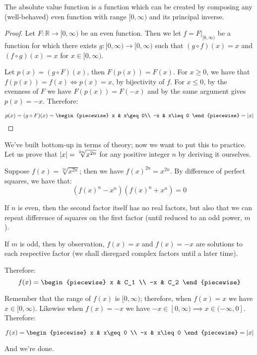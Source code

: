 \begin{theorem}
    The absolute value function is a function which can be created by composing any (well-behaved) even function with range $[0,\infty)$ and its principal inverse.

    \begin{proof}
        Let $F:\mathbb{R}\to[0,\infty)$ be an even function. Then we let $f=F\bigr\rvert_{[0,\infty)}$ be a function for which there exists $g:[0,\infty)\to[0,\infty)$ such that $(g\circ f)(x)=x$ and $(f\circ g)(x)=x$ for $x\in[0,\infty)$.

        Let $p(x)=(g\circ F)(x)$, then $F(p(x))=F(x)$. For $x\geq 0$, we have that $f(p(x))=f(x)\iff p(x)=x$, by bijectivity of $f$. For $x\leq 0$, by the evenness of $F$ we have $F(p(x))=F(-x)$ and by the same argument gives $p(x)=-x$. Therefore:

        $$
            p(x)=(g\circ F)(x)=\begin{piecewise}
                x & x\geq 0\\
                -x & x\leq 0
            \end{piecewise}=\abs{x}
        $$
    \end{proof}
\end{theorem}

\begin{example}
    We've built bottom-up in terms of theory; now we want to put this to practice. Let us prove that $\abs{x}=\sqrt[2n]{x^{2n}}$ for any positive integer $n$ by deriving it ourselves.

    Suppose $f(x)=\sqrt[2n]{x^{2n}}$; then we have $f(x)^{2n}=x^{2n}$. By difference of perfect squares, we have that:
    $$
        (f(x)^n-x^n)(f(x)^n+x^n)=0
    $$

    If $n$ is even, then the second factor itself has no real factors, but also that we can repeat difference of squares on the first factor (until reduced to an odd power, $m$).

    If $m$ is odd, then by observation, $f(x)=x$ and $f(x)=-x$ are solutions to each respective factor (we shall disregard complex factors until a later time).

    Therefore:
    $$
        f(x) = \begin{piecewise}
            x & C_1 \\
            -x & C_2
        \end{piecewise}
    $$

    Remember that the range of $f(x)$ is $[0,\infty)$; therefore, when $f(x)=x$ we have $x\in[0,\infty)$. Likewise when $f(x)=-x$ we have $-x\in[0,\infty)\implies x\in(-\infty,0]$. Therefore:

    $$
        f(x) = \begin{piecewise}
            x & x\geq 0 \\
            -x & x\leq 0
        \end{piecewise}=\abs{x}
    $$

    And we're done.
\end{example}

